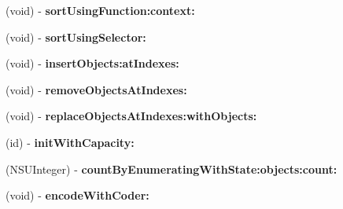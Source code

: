 \begin{DoxyCompactItemize}
\item 
\hypertarget{interfaceget_logistic_units_for_product_response_a636463d22817d44a0898f8a56bd31ddb}{}(void) -\/ {\bfseries sort\+Using\+Function\+:context\+:}\label{interfaceget_logistic_units_for_product_response_a636463d22817d44a0898f8a56bd31ddb}

\item 
\hypertarget{interfaceget_logistic_units_for_product_response_a0f06ca1f94fefc683e605639993e3324}{}(void) -\/ {\bfseries sort\+Using\+Selector\+:}\label{interfaceget_logistic_units_for_product_response_a0f06ca1f94fefc683e605639993e3324}

\item 
\hypertarget{interfaceget_logistic_units_for_product_response_a5ae6e231e0c1b44205cd17fd0d98535c}{}(void) -\/ {\bfseries insert\+Objects\+:at\+Indexes\+:}\label{interfaceget_logistic_units_for_product_response_a5ae6e231e0c1b44205cd17fd0d98535c}

\item 
\hypertarget{interfaceget_logistic_units_for_product_response_a0c7276f18d51e775743dcb5e0adb4d79}{}(void) -\/ {\bfseries remove\+Objects\+At\+Indexes\+:}\label{interfaceget_logistic_units_for_product_response_a0c7276f18d51e775743dcb5e0adb4d79}

\item 
\hypertarget{interfaceget_logistic_units_for_product_response_a4a0fe2cf2af0932708805beb23a04b5c}{}(void) -\/ {\bfseries replace\+Objects\+At\+Indexes\+:with\+Objects\+:}\label{interfaceget_logistic_units_for_product_response_a4a0fe2cf2af0932708805beb23a04b5c}

\item 
\hypertarget{interfaceget_logistic_units_for_product_response_a6ff0808b83d4ec1c1b1c98f9f4b69946}{}(id) -\/ {\bfseries init\+With\+Capacity\+:}\label{interfaceget_logistic_units_for_product_response_a6ff0808b83d4ec1c1b1c98f9f4b69946}

\item 
\hypertarget{interfaceget_logistic_units_for_product_response_ad1b02e0466c2f9d0071b4d8c6b70333b}{}(N\+S\+U\+Integer) -\/ {\bfseries count\+By\+Enumerating\+With\+State\+:objects\+:count\+:}\label{interfaceget_logistic_units_for_product_response_ad1b02e0466c2f9d0071b4d8c6b70333b}

\item 
\hypertarget{interfaceget_logistic_units_for_product_response_afb3399d33b1f984437fc213197c0ccbd}{}(void) -\/ {\bfseries encode\+With\+Coder\+:}\label{interfaceget_logistic_units_for_product_response_afb3399d33b1f984437fc213197c0ccbd}


\end{DoxyCompactItemize}

